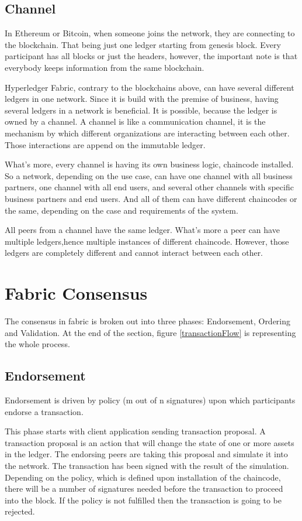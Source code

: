\documentclass[a4paper,11pt]{report}
\begin{document}
\subsection{Channel}
In Ethereum or Bitcoin, when someone joins the network, they are connecting to the blockchain. That being just one ledger starting from genesis block. Every participant has all blocks or just the headers, however, the important note is that everybody keeps information from the same blockchain.

	Hyperledger Fabric, contrary to the blockchains above, can have several different ledgers in one network. Since it is build with the premise of business, having several ledgers in a network is beneficial. It is possible, because the ledger is owned by a channel. A channel is like a communication channel, it is the mechanism by which different organizations are interacting between each other. Those interactions are append on the immutable ledger. 
	
What’s more, every channel is having its own business logic, chaincode installed. So a network, depending on the use case, can have one channel with all business partners, one channel with all end users, and several other channels with specific business partners and end users. And all of them can have different chaincodes or the same, depending on the case and requirements of the system.

All peers from a channel have the same ledger. What’s more a peer can have multiple ledgers,hence multiple instances of different chaincode. However, those ledgers are completely different and cannot interact between each other.


\section{Fabric Consensus}
\label{fabricConsensus}
The consensus in fabric is broken out into three phases: Endorsement, Ordering and Validation. At the end of the section, figure \ref{transactionFlow} is representing the whole process. 

\subsection{Endorsement}
Endorsement is driven by policy (m out of n signatures) upon which participants endorse a transaction.

	This phase starts with client application sending transaction proposal. A transaction proposal is an action that will change the state of one or more assets in the ledger. The endorsing peers are taking this proposal and simulate it into the network. The transaction has been signed with the result of the simulation. Depending on the policy, which is defined upon installation of the chaincode, there will be a number of signatures needed before the transaction to proceed into the block. If the policy is not fulfilled then the transaction is going to be rejected.
	    
\end{document}
